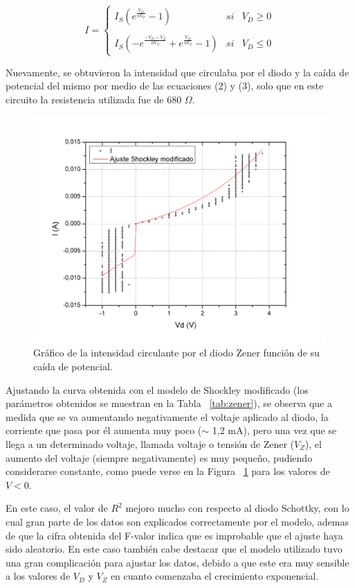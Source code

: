 \documentclass[twoside,twocolumn,a4paper]{article}
\begin{document}
\begin{equation}
\label{eq:shockley2}
I = \left\{ \begin{array}{lcc}
             I_{S}(e^\frac{V_{D}}{nV_{T}} - 1) &   si  & V_{D} \geq 0 \\
             \\ I_{S}(-e^\frac{-V_{D} - V_{Z}}{nV_{T}} + e^\frac{V_{D}}{nV_{T}} - 1) &  si  & V_{D} \leq 0
             \end{array}
   \right.
\end{equation}

Nuevamente, se obtuvieron la intensidad que circulaba por el diodo y la ca\'ida de potencial del mismo por medio de las ecuaciones (2) y (3), solo que en este circuito la resistencia utilizada fue de 680 $\Omega$.

\begin{figure}[h]
\includegraphics[width=\linewidth]{zener_ajuste.jpg}
\captionsetup{justification=centering}
\caption{Gr\'afico de la intensidad circulante por el diodo Zener funci\'on de su ca\'ida de potencial.}
\label{fig:zener_ajuste}
\end{figure} 

Ajustando la curva obtenida con el modelo de Shockley modificado (los par\'ametros obtenidos se muestran en la Tabla ~\ref{tab:zener}), se observa que a medida que se va aumentando negativamente el voltaje aplicado al diodo, la corriente que pasa por \'el aumenta muy poco ($\sim$ 1,2 mA), pero una vez que se llega a un determinado voltaje, llamada voltaje o tensi\'on de Zener ($V_{Z}$), el aumento del voltaje (siempre negativamente) es muy peque\~no, pudiendo considerarse constante, como puede verse en la Figura ~\ref{fig:zener_ajuste} para los valores de $V < 0$.\par
En este caso, el valor de $R^2$ mejoro mucho con respecto al diodo Schottky, con lo cual gran parte de los datos son explicados correctamente por el modelo, ademas de que la cifra obtenida del F-valor indica que es improbable que el ajuste haya sido aleatorio. 
En este caso tambi\'en cabe destacar que el modelo utilizado tuvo una gran complicaci\'on para ajustar los datos, debido a que este era muy sensible a los valores de $V_{D}$ y $V_{Z}$ en cuanto comenzaba el crecimiento exponencial.
\end{document}
